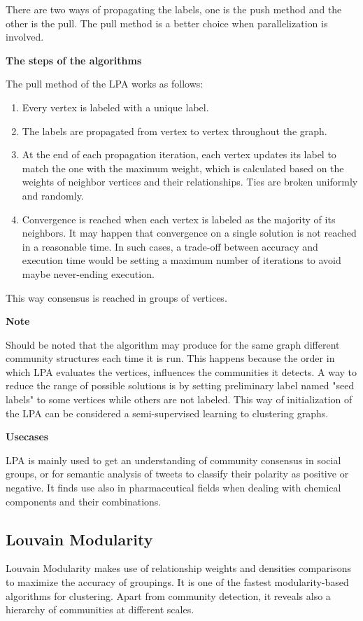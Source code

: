 There are two ways of propagating the labels, one is the \gls{push method} and the other is the pull. The \gls{pull method} is a better choice when parallelization is involved.
\medskip

\noindent\textbf{The steps of the algorithms}

The pull method of the LPA works as follows:
 \begin{enumerate}[noitemsep]
	\item Every vertex is labeled with a unique label.
	\item The labels are propagated from vertex to vertex throughout the graph.
	\item At the end of each propagation iteration, each vertex updates its label to match the one with the maximum weight, which is calculated based on the weights of neighbor vertices
and their relationships.
          Ties are broken uniformly and randomly.
	\item Convergence is reached when each vertex is labeled as the majority of its neighbors.
	      It may happen that convergence on a single solution is not reached in a reasonable time.
	      In such cases, a trade-off between accuracy and execution time would be setting a maximum number of iterations to avoid maybe never-ending execution.
\end{enumerate}
This way consensus is reached in groups of vertices.
\medskip

\noindent\textbf{Note}

Should be noted that the algorithm may produce for the same graph different community structures each time it is run.
This happens because the order in which \acrshort{LPA} evaluates the vertices, influences the communities it detects.
A way to reduce the range of possible solutions is by setting preliminary label named "seed labels" to some vertices while others are not labeled.
This way of initialization of the \acrshort{LPA} can be considered a semi-supervised learning to clustering graphs.
\medskip

\noindent\textbf{Usecases}

LPA is mainly used to get an understanding of community consensus in social groups, or for semantic analysis of tweets to classify their polarity as positive or negative.
It finds use also in pharmaceutical fields when dealing with chemical components and their combinations.

\subsection[Louvain Modularity]{\gls{Louvain Modularity}} \label{subsection:CommunityDetection/Clusteringmethodologies/LouvainModularity}
\gls{Louvain Modularity} makes use of relationship weights and densities comparisons to maximize the \gls{accuracy of grouping}s.
It is one of the fastest modularity-based algorithms for clustering. Apart from community detection, it reveals also a hierarchy of communities at different scales.

